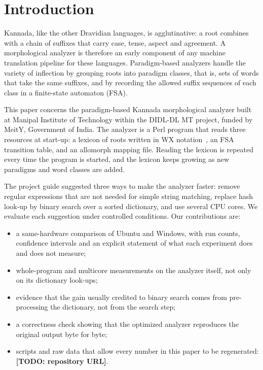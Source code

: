\documentclass[conference]{IEEEtran}
\newcommand{\todo}[1]{{\color{red}\textbf{[TODO: #1]}}}
\begin{document}
\section{Introduction}
Kannada, like the other Dravidian languages, is agglutinative: a root combines with a chain of suffixes that carry case, tense, aspect and agreement. A morphological analyzer is therefore an early component of any machine translation pipeline for these languages. Paradigm-based analyzers handle the variety of inflection by grouping roots into paradigm classes, that is, sets of words that take the same suffixes, and by recording the allowed suffix sequences of each class in a finite-state automaton (FSA).

This paper concerns the paradigm-based Kannada morphological analyzer built at Manipal Institute of Technology within the DIDL-DL MT project, funded by MeitY, Government of India. The analyzer is a Perl program that reads three resources at start-up: a lexicon of roots written in WX notation~\cite{bharati1995,gupta2010}, an FSA transition table, and an allomorph mapping file. Reading the lexicon is repeated every time the program is started, and the lexicon keeps growing as new paradigms and word classes are added.

The project guide suggested three ways to make the analyzer faster: remove regular expressions that are not needed for simple string matching, replace hash look-up by binary search over a sorted dictionary, and use several CPU cores. We evaluate each suggestion under controlled conditions. Our contributions are:
\begin{itemize}
\item a same-hardware comparison of Ubuntu and Windows, with run counts, confidence intervals and an explicit statement of what each experiment does and does not measure;
\item whole-program and multicore measurements on the analyzer itself, not only on its dictionary look-ups;
\item evidence that the gain usually credited to binary search comes from pre-processing the dictionary, not from the search step;
\item a correctness check showing that the optimized analyzer reproduces the original output byte for byte;
\item scripts and raw data that allow every number in this paper to be regenerated: \todo{repository URL}.
\end{itemize}
\end{document}
